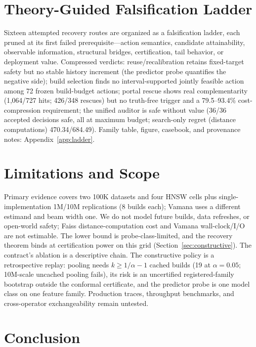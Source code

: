 \documentclass{article}
\begin{document}
\section{Theory-Guided Falsification Ladder}
\label{sec:ladder}

Sixteen attempted recovery routes are organized as a falsification ladder, each pruned at its first
failed prerequisite---action semantics, candidate attainability, observable information, structural
bridges, certification, tail behavior, or deployment value. Compressed verdicts: reuse/recalibration
retains fixed-target safety but no stable history increment (the predictor probe quantifies the negative
side); build selection finds no interval-supported jointly feasible action among 72 frozen
build-budget actions; portal rescue shows real complementarity (1{,}064/727 hits; 426/348 rescues) but no
truth-free trigger and a 79.5--93.4\% cost-compression requirement; the unified auditor is safe without
value (36/36 accepted decisions safe, all at maximum budget; search-only regret (distance computations) 470.34/684.49). Family table, figure,
casebook, and provenance notes: Appendix~\ref{app:ladder}.

\section{Limitations and Scope}
\label{sec:limitations}

Primary evidence covers two 100K datasets and four HNSW cells plus single-implementation 1M/10M
replications (8 builds each); Vamana uses a different estimand and beam width one. We do not model future
builds, data refreshes, or open-world safety; Faiss distance-computation cost and Vamana wall-clock/I/O
are not estimable. The lower bound is probe-class-limited, and the recovery theorem binds at certification power on this
grid (Section~\ref{sec:constructive}).
The contract's ablation is a descriptive chain. The constructive policy is a retrospective replay:
pooling needs $k\ge 1/\alpha-1$ cached builds (19 at $\alpha{=}0.05$; 10M-scale uncached pooling
fails), its risk is an uncertified registered-family bootstrap outside the conformal certificate, and the
predictor probe is one model class on one feature family. Production traces, throughput benchmarks, and cross-operator exchangeability remain untested.

\section{Conclusion}
\label{sec:conclusion}
\end{document}
